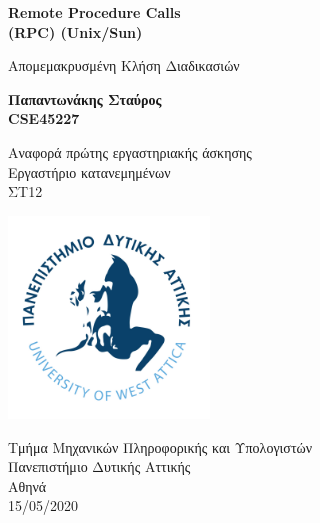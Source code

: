 %
%
%
\begin{titlepage}
	\begin{center}
		\vspace{1cm}	
		\Huge	
		\textbf{Remote Procedure Calls \\ (RPC) (Unix/Sun)}
		
		\vspace{0.5cm}
		\large
		Απομεμακρυσμένη Κλήση Διαδικασιών
		
		\vspace{1.5cm}
		\textbf{Παπαντωνάκης Σταύρος\\ CSE45227}
		\vfill
		
		Αναφορά πρώτης εργαστηριακής άσκησης\\
		Εργαστήριο κατανεμημένων\\
		ΣΤ12
		
		\vspace{0.8cm}
		\begin{center}
			\includegraphics[width=0.4\textwidth]{image/logo.jpg}		
		\end{center}
		\normalsize
		Τμήμα Μηχανικών Πληροφορικής και Υπολογιστών\\
		Πανεπιστήμιο Δυτικής Αττικής\\
		Αθηνά\\
		15/05/2020\\	
	\end{center}
\end{titlepage}